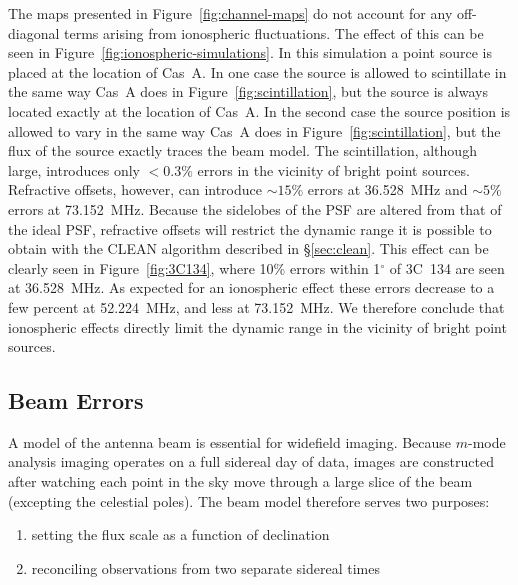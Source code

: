 \documentclass[twocolumn]{aastex61}
\begin{document}
The maps presented in Figure~\ref{fig:channel-maps} do not account for any off-diagonal terms
arising from ionospheric fluctuations. The effect of this can be seen in
Figure~\ref{fig:ionospheric-simulations}. In this simulation a point source is placed at the
location of Cas~A. In one case the source is allowed to scintillate in the same way Cas~A does in
Figure~\ref{fig:scintillation}, but the source is always located exactly at the location of Cas~A.
In the second case the source position is allowed to vary in the same way Cas~A does in
Figure~\ref{fig:scintillation}, but the flux of the source exactly traces the beam model. The
scintillation, although large, introduces only $<0.3\%$ errors in the vicinity of bright point
sources. Refractive offsets, however, can introduce $\sim 15\%$ errors at 36.528~MHz and $\sim 5\%$
errors at 73.152~MHz.  Because the sidelobes of the PSF are altered from that of the ideal PSF,
refractive offsets will restrict the dynamic range it is possible to obtain with the CLEAN algorithm
described in \S\ref{sec:clean}. This effect can be clearly seen in Figure~\ref{fig:3C134}, where
10\% errors within 1$^\circ$ of 3C~134 are seen at 36.528~MHz.  As expected for an ionospheric
effect these errors decrease to a few percent at 52.224~MHz, and less at 73.152~MHz. We therefore
conclude that ionospheric effects directly limit the dynamic range in the vicinity of bright point
sources.

\subsection{Beam Errors}

A model of the antenna beam is essential for widefield imaging. Because $m$-mode analysis imaging
operates on a full sidereal day of data, images are constructed after watching each point in the sky
move through a large slice of the beam (excepting the celestial poles). The beam model therefore
serves two purposes:

\begin{enumerate}
    \item setting the flux scale as a function of declination
    \item reconciling observations from two separate sidereal times
\end{enumerate}
\end{document}
